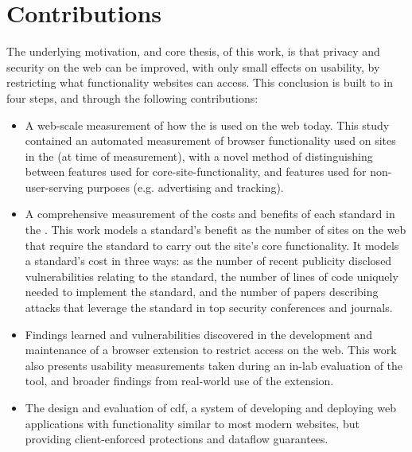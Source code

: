 \section{Contributions}
\label{intro:contributions}

The underlying motivation, and core thesis, of this work, is that privacy
and security on the web can be improved, with only small effects on usability,
by restricting what functionality websites can access.  This conclusion
is built to in four steps, and through the following contributions:

\begin{itemize}
    \item A web-scale measurement of how the \WAPI is used on the web today.
          This study contained an automated measurement of browser functionality
          used on sites in the \ATK (at time of measurement), with
          a novel method of distinguishing between features used
          for core-site-functionality, and features used for
          non-user-serving purposes (e.g. advertising and tracking).
    \item A comprehensive measurement of the costs and benefits of each standard
          in the \WAPI.  This work models a standard's
          benefit as the number of sites on the web that require the standard
          to carry out the site's core functionality.  It models
          a standard's cost in three ways: as the number of recent publicity
          disclosed vulnerabilities relating to the standard, the number
          of lines of code uniquely needed to implement the standard, and
          the number of papers describing attacks that leverage the standard
          in top security conferences and journals.
    \item Findings learned and vulnerabilities discovered in the development
          and maintenance of a browser extension to restrict \WAPI access on
          the web.  This work also presents usability
          measurements taken during an in-lab evaluation of the tool, and
          broader findings from real-world use of the extension.
    \item The design and evaluation of \gls{cdf}, a system of developing and deploying
          web applications with functionality similar to most modern websites,
          but providing client-enforced protections and dataflow
          guarantees.
\end{itemize}
